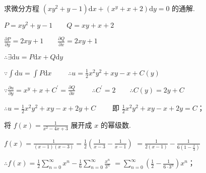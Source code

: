 \begin{problem}[points = 6]
求微分方程 $(xy^2 + y - 1)\mathrm{d}x + (x^y + x + 2)\mathrm{d}y = 0$ 的通解.
\end{problem}
\begin{solution}
    $P = xy^2 + y - 1 \qquad Q = xy + x + 2$

    $\frac{\partial P}{\partial y} = 2xy + 1 \qquad \frac{\partial Q}{\partial x} = 2xy + 1$

    $\therefore \exists \mathrm{d}u = P\mathrm{d}x + Q\mathrm{d}y$

    $\because \int \mathrm{d}u = \int P\mathrm{d}x \qquad$
    $\therefore u = \frac{1}{2}x^2y^2 + xy - x + C(y)$

    $\because \frac{\partial u}{\partial y} = x^y + x + C^{\prime} = \frac{\partial Q}{\partial x} \qquad$
    $\therefore C^{\prime} = 2 \qquad \therefore C(y) = 2y + C$

    $\therefore u = \frac{1}{2}x^2y^2 + xy - x + 2y + C \qquad$
    即 $\frac{1}{2}x^2y^2 + xy - x + 2y = C$；
\end{solution}

\begin{problem}[points = 7]
将 $f(x) = \frac{1}{x^2 - 4x + 3}$ 展开成 $x$ 的幂级数.
\end{problem}
\begin{solution}
    $f(x) = \frac{1}{(x - 1)(x - 3)} = \frac{1}{2}\left(\frac{1}{x - 3} - \frac{1}{x - 1}\right)$
    $= \frac{1}{2(x - 1)} - \frac{1}{6\left(1 - \frac{x}{3}\right)}$

    $\therefore f(x) = \frac{1}{2}\sum\limits_{n = 0}^{\infty} x^n - \frac{1}{6}\sum\limits_{n = 0}^{\infty} \frac{x^n}{3^n}$
    $=\sum\limits_{n = 0}^{\infty} \left(\frac{1}{2} - \frac{1}{6 \cdot 3^n}\right)x^n$；
\end{solution}

